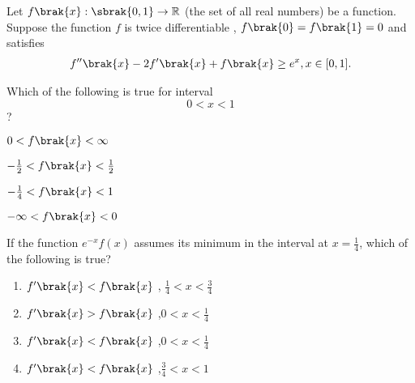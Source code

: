 \item {
Let $f\brak{x} : \sbrak{0,1} \to\mathbb{R}$
(the set of all real numbers) be a function. Suppose the function $f$ is twice differentiable , $f\brak{0}=f\brak{1}=0$ and satisfies \begin{align} f''\brak{x}-2f'\brak{x}+f\brak{x} \geq e^x , x \in [0,1].\end{align} 

\item Which of the following is true for interval     $$0<x<1$$?
\hfill{}

\begin{enumerate}
\begin{multicols}{2}
\item $0<f\brak{x}< \infty$ 
\columnbreak
\item $ -\frac{1}{2} <f\brak{x}< \frac{1}{2}$
\end{multicols}
\begin{multicols}{2}
\item $-\frac{1}{4}<f\brak{x}<1$
\item $-\infty <f\brak{x}<0$
\end{multicols}
\end{enumerate}


\item If the function $e^{-x}f(x)$ assumes its minimum in the interval  at $x=\frac{1}{4}$, which of the following is true?


\hfill{}

\begin{enumerate}

\item $f'\brak{x}<f\brak{x}$ , $\frac{1}{4}<x<\frac{3}{4}$ \\

\item $f'\brak{x}>f\brak{x}$ ,$0<x<\frac{1}{4}$ \\ 

\item $f'\brak{x}<f\brak{x}$ ,$0<x<\frac{1}{4}$ \\

\item $f'\brak{x}<f\brak{x}$ ,$\frac{3}{4}<x<1$ \\


\end{enumerate}
}
